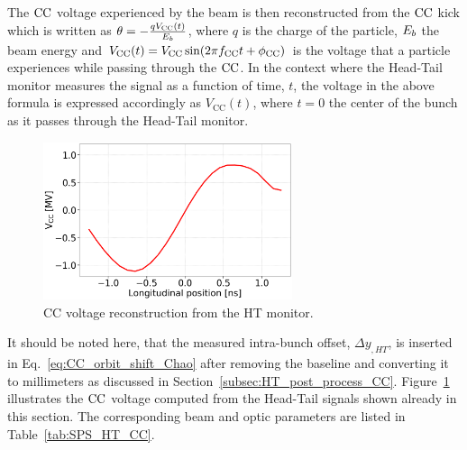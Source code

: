The ${\mathrm{CC}}$ voltage experienced by the beam is then reconstructed from the ${\mathrm{CC}}$ kick which is written as $\theta = - \frac{q V_\mathrm{CC}(t)}{{E_b}}$, where $q$ is the charge of the particle, ${E_b}$ the beam energy and $V_\mathrm{CC}(t) = V_\mathrm{CC} \sin(2 \pi {f_\mathrm{CC}} t + \phi_\mathrm{CC}) $ is the voltage that a particle experiences while passing through the ${\mathrm{CC}}$. In the context where the Head-Tail monitor measures the signal as a function of time, $t$, the voltage in the above formula is expressed accordingly as $V_\mathrm{CC}(t)$, where $t=0$ the center of the bunch as it passes through the Head-Tail monitor.

\begin{figure}[!h]
\centering         
\includegraphics[width=0.65\textwidth]{images/Ch4/HT_VCC_callibration_20180530_135105_CC_post_processing.png}
    \caption{CC voltage reconstruction from the HT monitor.}
    \label{fig:VCC_from_HT_monitor_measurement}
\end{figure}

It should be noted here, that the measured intra-bunch offset, $\Delta y_{, HT}$, is inserted in Eq.~\eqref{eq:CC_orbit_shift_Chao} after removing the baseline and converting it to millimeters as discussed in Section~\ref{subsec:HT_post_process_CC}. Figure~\ref{fig:VCC_from_HT_monitor_measurement} illustrates the ${\mathrm{CC}}$ voltage computed from the Head-Tail signals shown already in this section. The corresponding beam and optic parameters are listed in Table~\ref{tab:SPS_HT_CC}.

